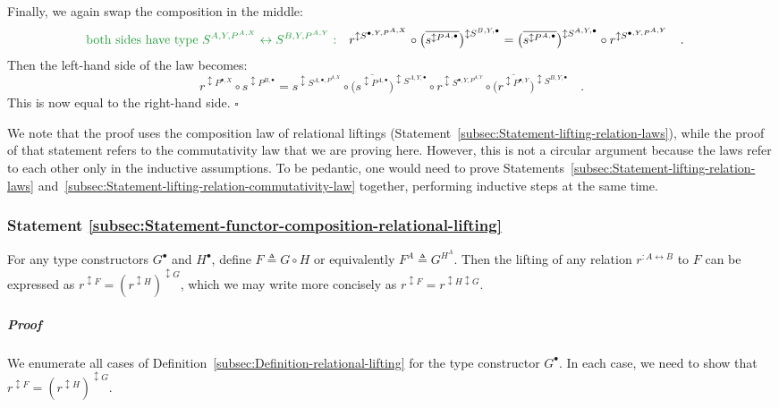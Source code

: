 Finally, we again swap the composition in the middle:
\begin{align*}
{\color{greenunder}\text{both sides have type }S^{A,Y,P^{A,X}}\leftrightarrow S^{B,Y,P^{A,Y}}:}\quad & r^{\updownarrow S^{\bullet,Y,P^{A,X}}}\circ\big(\overline{s^{\updownarrow P^{A,\bullet}}}\big)^{\updownarrow S^{B,Y,\bullet}}=\big(\overline{s^{\updownarrow P^{A,\bullet}}}\big)^{\updownarrow S^{A,Y,\bullet}}\circ r^{\updownarrow S^{\bullet,Y,P^{A,Y}}}\quad.
\end{align*}
Then the left-hand side of the law becomes:
\[
r^{\updownarrow P^{\bullet,X}}\circ s^{\updownarrow P^{B,\bullet}}=s^{\updownarrow S^{A,\bullet,P^{A,X}}}\circ\big(\overline{s^{\updownarrow P^{A,\bullet}}}\big)^{\updownarrow S^{A,Y,\bullet}}\circ r^{\updownarrow S^{\bullet,Y,P^{A,Y}}}\circ\big(\overline{r^{\updownarrow P^{\bullet,Y}}}\big)^{\updownarrow S^{B,Y,\bullet}}\quad.
\]
This is now equal to the right-hand side. $\square$

We note that the proof uses the composition law of relational liftings
(Statement~\ref{subsec:Statement-lifting-relation-laws}), while
the proof of that statement refers to the commutativity law that we
are proving here. However, this is not a circular argument because
the laws refer to each other only in the inductive assumptions. To
be pedantic, one would need to prove Statements~\ref{subsec:Statement-lifting-relation-laws}
and~\ref{subsec:Statement-lifting-relation-commutativity-law} together,
performing inductive steps at the same time.

\subsubsection{Statement \label{subsec:Statement-functor-composition-relational-lifting}\ref{subsec:Statement-functor-composition-relational-lifting}}

For any type constructors $G^{\bullet}$ and $H^{\bullet}$, define
$F\triangleq G\circ H$ or equivalently $F^{A}\triangleq G^{H^{A}}$.
Then the lifting of any relation $r^{:A\leftrightarrow B}$ to $F$
can be expressed as $r^{\updownarrow F}=(r^{\updownarrow H})^{\updownarrow G}$,
which we may write more concisely as $r^{\updownarrow F}=r^{\updownarrow H\updownarrow G}$.

\subparagraph{Proof}

We enumerate all cases of Definition~\ref{subsec:Definition-relational-lifting}
for the type constructor $G^{\bullet}$. In each case, we need to
show that $r^{\updownarrow F}=(r^{\updownarrow H})^{\updownarrow G}$.

